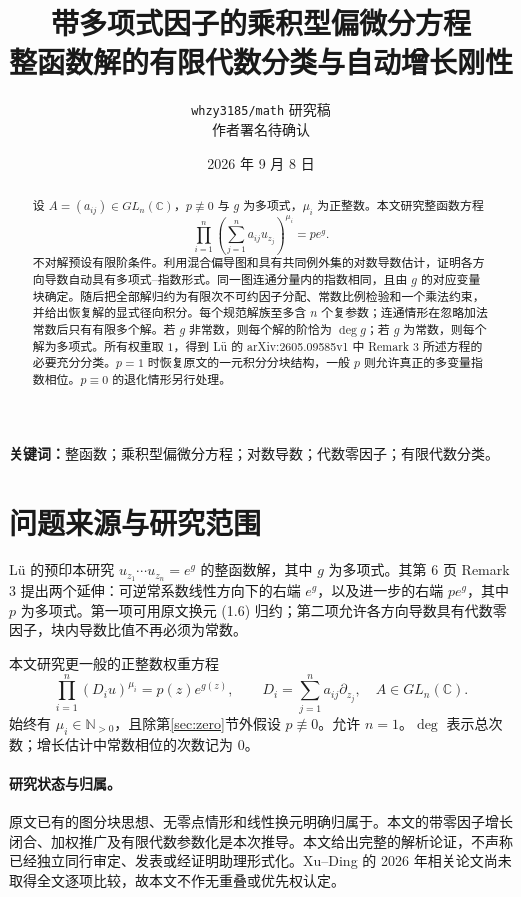 \documentclass[UTF8,11pt,a4paper,fontset=fandol]{ctexart}
\title{带多项式因子的乘积型偏微分方程\\整函数解的有限代数分类与自动增长刚性}
\author{\texttt{whzy3185/math} 研究稿\\\small 作者署名待确认}
\date{2026 年 9 月 8 日}
\theoremstyle{definition}\newtheorem{definition}[theorem]{定义}
\theoremstyle{remark}\newtheorem{remark}[theorem]{注}
\newcommand{\C}{\mathbb C}\newcommand{\N}{\mathbb N}
\begin{document}
\maketitle
\begin{abstract}
设 $A=(a_{ij})\in GL_n(\C)$，$p\not\equiv0$ 与 $g$ 为多项式，$\mu_i$ 为正整数。本文研究整函数方程
\[
\prod_{i=1}^n\left(\sum_{j=1}^n a_{ij}u_{z_j}\right)^{\mu_i}=pe^g.
\]
不对解预设有限阶条件。利用混合偏导图和具有共同例外集的对数导数估计，证明各方向导数自动具有多项式--指数形式。同一图连通分量内的指数相同，且由 $g$ 的对应变量块确定。随后把全部解归约为有限次不可约因子分配、常数比例检验和一个乘法约束，并给出恢复解的显式径向积分。每个规范解族至多含 $n$ 个复参数；连通情形在忽略加法常数后只有有限多个解。若 $g$ 非常数，则每个解的阶恰为 $\deg g$；若 $g$ 为常数，则每个解为多项式。所有权重取 $1$，得到 Lü 的 arXiv:2605.09585v1 中 Remark 3 所述方程的必要充分分类。$p=1$ 时恢复原文的一元积分分块结构，一般 $p$ 则允许真正的多变量指数相位。$p\equiv0$ 的退化情形另行处理。
\end{abstract}
\noindent\textbf{关键词：}整函数；乘积型偏微分方程；对数导数；代数零因子；有限代数分类。

\section{问题来源与研究范围}
Lü 的预印本\cite{Lu2026}研究 $u_{z_1}\cdots u_{z_n}=e^g$ 的整函数解，其中 $g$ 为多项式。其第 6 页 Remark 3 提出两个延伸：可逆常系数线性方向下的右端 $e^g$，以及进一步的右端 $pe^g$，其中 $p$ 为多项式。第一项可用原文换元 (1.6) 归约；第二项允许各方向导数具有代数零因子，块内导数比值不再必须为常数。

本文研究更一般的正整数权重方程
\begin{equation}\label{eq:original}
\prod_{i=1}^n(D_i u)^{\mu_i}=p(z)e^{g(z)},\qquad
D_i=\sum_{j=1}^n a_{ij}\partial_{z_j},\quad A\in GL_n(\C).
\end{equation}
始终有 $\mu_i\in\N_{>0}$，且除第\ref{sec:zero}节外假设 $p\not\equiv0$。允许 $n=1$。$\deg$ 表示总次数；增长估计中常数相位的次数记为 $0$。

\paragraph{研究状态与归属。}
原文已有的图分块思想、无零点情形和线性换元明确归属于\cite{Lu2026}。本文的带零因子增长闭合、加权推广及有限代数参数化是本次推导。本文给出完整的解析论证，不声称已经独立同行审定、发表或经证明助理形式化。Xu--Ding 的 2026 年相关论文\cite{XuDing2026}尚未取得全文逐项比较，故本文不作无重叠或优先权认定。
\end{document}
